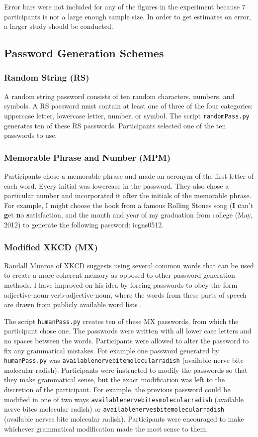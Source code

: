 \documentclass{article}
\begin{document}
Error bars were not included for any of the figures in the experiment because 7 participants is not a large enough sample size. In order to get estimates on error, a larger study should be conducted.



\subsection*{Password Generation Schemes}
\subsubsection*{Random String (RS)}
A random string password consists of ten random characters, numbers, and symbols. A RS password must contain at least one of three of the four categories: uppercase letter, lowercase letter, number, or symbol. The script \texttt{randomPass.py} generates ten of these RS passwords. Participants selected one of the ten passwords to use.


\subsubsection*{Memorable Phrase and Number (MPM)}
Participants chose a memorable phrase and made an acronym of the first letter of each word. Every initial was lowercase in the password. They also chose a particular number and incorporated it after the initials of the memorable phrase. For example, I might choose the hook from a famous Rolling Stones song (\textbf{I} \textbf{c}an't \textbf{g}et \textbf{n}o \textbf{s}atisfaction, and the month and year of my graduation from college (May, 2012) to generate the following password: icgns0512. 

\subsubsection*{Modified XKCD (MX)}
Randall Munroe of XKCD suggests using several common words that can be used to create a more coherent memory as opposed to other password generation methods. I have improved on his idea by forcing passwords to obey the form adjective-noun-verb-adjective-noun, where the words from these parts of speech are drawn from publicly available word lists \cite{nouns, adjectives, verbs}.

The script \texttt{humanPass.py} creates ten of these MX passwords, from which the participant chose one. The passwords were written with all lower case letters and no spaces between the words. Participants were allowed to alter the password to fix any grammatical mistakes. For example one password generated by \texttt{humanPass.py} was \texttt{availablenervebitemolecularradish} (available nerve bite molecular radish). Participants were instructed to modify the passwords so that they make grammatical sense, but the exact modification was left to the discretion of the participant. For example, the previous password could be modified in one of two ways \texttt{availablenervebitesmolecularradish} (available nerve bites molecular radish) or \texttt{availablenervesbitemolecularradish} (available nerves bite molecular radish). Participants were encouraged to make whichever grammatical modification made the most sense to them.
\end{document}
